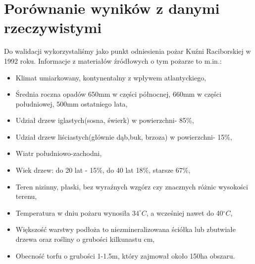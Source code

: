 \documentclass[a4paper, 11pt]{article}
\begin{document}
	\section*{Porównanie wyników z danymi rzeczywistymi}
	\indent
	
	Do walidacji wykorzystaliśmy jako punkt odniesienia pożar Kuźni Raciborskiej w 1992 roku.
	Informacje z materiałów źródłowych o tym pożarze to m.in.:
	\begin{itemize}
		\item Klimat umiarkowany, kontynentalny z wpływem atlantyckiego,
		\item Średnia roczna opadów 650mm w części północnej, 660mm w części południowej, 500mm ostatniego lata,
		\item Udział drzew iglastych(sosna, świerk) w powierzchni- 85\%,
		\item Udział drzew liściastych(głównie dąb,buk, brzoza) w powierzchni- 15\%,
		\item Wiatr południowo-zachodni,
		\item Wiek drzew: do 20 lat - 15\%, do 40 lat 18\%, starsze 67\%,
		\item Teren nizinny, płaski, bez wyraźnych wzgórz czy znacznych różnic wysokości terenu,
		\item Temperatura w dniu pożaru wynosiła $34^\circ C$, a wcześniej nawet do 40$^\circ C$,
		\item Większość warstwy podłoża to niezmineralizowana ściółka lub zbutwiałe drzewa oraz rośliny o grubości kilkunastu cm,
		\item Obecność torfu o grubości 1-1.5m, który zajmował około 150ha obszaru.
	\end{itemize}
\end{document}
